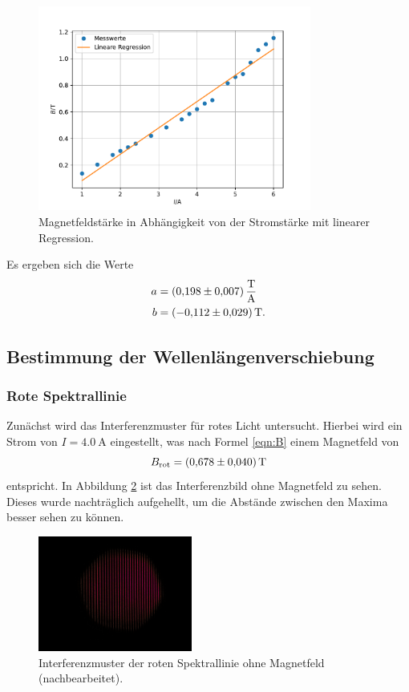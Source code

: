 \FloatBarrier
\begin{figure}
  \centering
  \includegraphics[width=0.8\textwidth]{a.pdf}
  \caption{Magnetfeldstärke in Abhängigkeit von der Stromstärke mit linearer Regression.}
  \label{fig:a}
\end{figure}
\FloatBarrier
Es ergeben sich die Werte 
\begin{align*}
    a &= \SI{0.198\pm0.007}{\tesla\per\ampere} \\
    b &= \SI{-0.112\pm0.029}{\tesla}.
\end{align*}

\subsection{Bestimmung der Wellenlängenverschiebung}
\subsubsection{Rote Spektrallinie}
Zunächst wird das Interferenzmuster für rotes Licht untersucht. 
Hierbei wird ein Strom von $I=\SI{4.0}{\ampere}$ eingestellt, was nach Formel \ref{eqn:B} einem Magnetfeld von 
\begin{equation*}
    B_{\si{rot}} = \SI{0.678\pm0.040}{\tesla} 
\end{equation*}
entspricht.
In Abbildung \ref{fig:r1} ist das Interferenzbild ohne Magnetfeld zu sehen. Dieses wurde nachträglich aufgehellt, um die Abstände zwischen den Maxima besser 
sehen zu können.

\FloatBarrier
\begin{figure}
  \centering
  \includegraphics[width=0.45\textwidth]{IMG_0103k.jpg}
  \caption{Interferenzmuster der roten Spektrallinie ohne Magnetfeld (nachbearbeitet).}
  \label{fig:r1}
\end{figure}
\FloatBarrier

